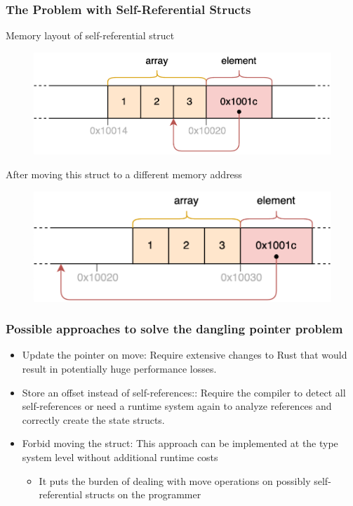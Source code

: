\begin{frame}[fragile]
    \frametitle{The Problem with Self-Referential Structs}
% 
Memory layout of self-referential struct
% 
    \begin{figure}
    \includegraphics[width=0.53\linewidth]{figs/self-referential-struct.png}
    \end{figure} \pause
% 
% 
After moving this struct to a different memory address
% 
    \begin{figure}
    \includegraphics[width=0.53\linewidth]{figs/self-referential-struct-moved.png}
    \end{figure}
% 
\end{frame}
\begin{frame}[fragile]
    \frametitle{Possible approaches to solve the dangling pointer problem}
% 
% 
    \begin{itemize}
        \item {\color{red}Update the pointer on move:} Require extensive changes to Rust that would result in potentially huge  performance losses. \pause
        \item {\color{red}Store an offset instead of self-references:}: Require the compiler to {\color{red}detect all self-references} or need a runtime system again to analyze references and correctly create the  state structs. \pause
        \item {\color{red}Forbid moving the struct:} This approach can be implemented at the type system level without additional  runtime costs \pause
    	\begin{itemize}
    	    \item It puts the burden of dealing with  move operations on possibly self-referential structs on the programmer
    	\end{itemize}
    \end{itemize}

\end{frame}
